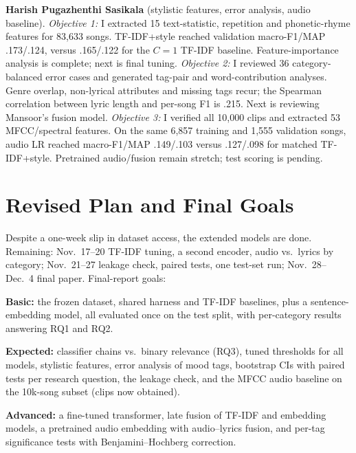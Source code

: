 \documentclass{article}
\begin{document}
\textbf{Harish Pugazhenthi Sasikala} (stylistic features, error analysis, audio baseline). \emph{Objective 1:} I extracted 15 text-statistic, repetition and phonetic-rhyme features for 83,633 songs. TF-IDF+style reached validation macro-F1/MAP .173/.124, versus .165/.122 for the $C{=}1$ TF-IDF baseline. Feature-importance analysis is complete; next is final tuning. \emph{Objective 2:} I reviewed 36 category-balanced error cases and generated tag-pair and word-contribution analyses. Genre overlap, non-lyrical attributes and missing tags recur; the Spearman correlation between lyric length and per-song F1 is .215. Next is reviewing Mansoor's fusion model. \emph{Objective 3:} I verified all 10,000 clips and extracted 53 MFCC/spectral features. On the same 6,857 training and 1,555 validation songs, audio LR reached macro-F1/MAP .149/.103 versus .127/.098 for matched TF-IDF+style. Pretrained audio/fusion remain stretch; test scoring is pending.

\section{Revised Plan and Final Goals}\label{sec:plan}

Despite a one-week slip in dataset access, the extended models are done. Remaining: Nov.~17--20 TF-IDF tuning, a second encoder, audio vs.\ lyrics by category; Nov.~21--27 leakage check, paired tests, one test-set run; Nov.~28--Dec.~4 final paper. Final-report goals:

\textbf{Basic:} the frozen dataset, shared harness and TF-IDF baselines, plus a sentence-embedding model, all evaluated once on the test split, with per-category results answering RQ1 and RQ2.

\textbf{Expected:} classifier chains vs.\ binary relevance (RQ3), tuned thresholds for all models, stylistic features, error analysis of mood tags, bootstrap CIs with paired tests per research question, the leakage check, and the MFCC audio baseline on the 10k-song subset (clips now obtained).

\textbf{Advanced:} a fine-tuned transformer, late fusion of TF-IDF and embedding models, a pretrained audio embedding with audio--lyrics fusion, and per-tag significance tests with Benjamini--Hochberg correction.


\end{document}
